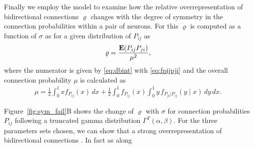 Finally we employ the model to examine how the relative overrepresentation of bidirectional connections $\varrho$ changes with the degree of symmetry in the connection probabilities within a pair of neurons. For this $\varrho$ is computed as a function of $\sigma$ as for a given distribution of $P_{ij}$ as
%
\begin{align}
  \varrho = \frac{\operatorname{\mathbf{E}}(P_{ij} P_{ji})}{\mu^2}, \label{eq:rho_sigma}
\end{align}
%
where the numerator is given by \eqref{eq:dbint} with %
\eqref{eq:fpijpji} %
%
%
and the overall connection probability $\mu$ is calculated as
%
\begin{align}
 \mu = \frac{1}{2} \int_0^1 x f_{P_{ij}}(x)\,dx + \frac{1}{2} \int_0^1 f_{P_{ij}}(x) \int_0^1 y \,f_{P_{ji}\vert P_{ij}}(y \mid x) \,dy \, dx.
\end{align}
%

Figure~\ref{fig:sym_fail}B shows the change of $\varrho$ with $\sigma$ for connection probabilities $P_{ij}$ following a truncated gamma distribution $\Gamma^T(\alpha, \beta)$. For the three parameters sets chosen, we can show that a strong overrepresentation of bidirectional connections . In fact as along 

